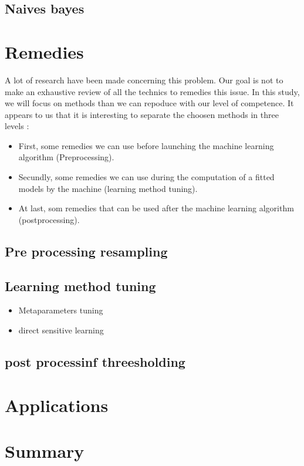 \documentclass[
]{book}
\providecommand{\tightlist}{%
  \setlength{\itemsep}{0pt}\setlength{\parskip}{0pt}}
\begin{document}
\hypertarget{naives-bayes}{%
\section{Naives bayes}\label{naives-bayes}}

\hypertarget{remedies}{%
\chapter{Remedies}\label{remedies}}

A lot of research have been made concerning this problem. Our goal is not to make an exhaustive review of all the technics to remedies this issue.
In this study, we will focus on methods than we can repoduce with our level of competence. It appears to us that it is interesting to separate the choosen methods in three levels :

\begin{itemize}
\tightlist
\item
  First, some remedies we can use before launching the machine learning algorithm (Preprocessing).
\item
  Secundly, some remedies we can use during the computation of a fitted models by the machine (learning method tuning).
\item
  At last, som remedies that can be used after the machine learning algorithm (postprocessing).
\end{itemize}

\hypertarget{pre-processing-resampling}{%
\section{Pre processing resampling}\label{pre-processing-resampling}}

\hypertarget{learning-method-tuning}{%
\section{Learning method tuning}\label{learning-method-tuning}}

\begin{itemize}
\tightlist
\item
  Metaparameters tuning
\item
  direct sensitive learning
\end{itemize}

\hypertarget{post-processinf-threesholding}{%
\section{post processinf threesholding}\label{post-processinf-threesholding}}

\hypertarget{applications}{%
\chapter{Applications}\label{applications}}

\hypertarget{summary}{%
\chapter{Summary}\label{summary}}

  
\end{document}
